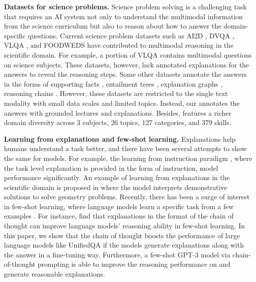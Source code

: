 \textbf{Datasets for science problems.} Science problem solving is a challenging task that requires an AI system not only to understand the multimodal information from the science curriculum but also to reason about how to answer the domain-specific questions. Current science problem datasets such as AI2D \cite{kembhavi2016diagram}, DVQA \cite{kafle2018dvqa}, VLQA \cite{sampat2020visuo}, and FOODWEDS \cite{krishnamurthy2016semantic} have contributed to multimodal reasoning in the scientific domain. For example, a portion of VLQA contains multimodal questions on science subjects.  These datasets, however, lack annotated explanations for the answers to reveal the reasoning steps. Some other datasets annotate the answers in the forms of supporting facts \cite{mihaylov2018can,Khot2020QASCAD}, entailment trees \cite{dalvi2021explaining}, explanation graphs \cite{jansen2018worldtree}, reasoning chains \cite{jhamtani2020learning}. However, these datasets are restricted to the single text modality with small data scales and limited topics. Instead, our \name{} annotates the answers with grounded lectures and explanations. Besides, \name{} features a richer domain diversity across 3 subjects, 26 topics, 127 categories, and 379 skills.

\textbf{Learning from explanations and few-shot learning.}
Explanations help humans understand a task better, and there have been several attempts to show the same for models. For example, the learning from instruction paradigm \cite{mishra2021cross,ouyang2022training,wei2021finetuned,mishra2021reframing,parmar-etal-2022-boxbart, lampinen2022can}, where the task level explanation is provided in the form of instruction,  model performance significantly.
An example of learning from explanations in the scientific domain is proposed in \cite{sachan2017learning} where the model interprets demonstrative solutions to solve geometry problems.
Recently, there has been a surge of interest in few-shot learning, where language models learn a specific task from a few examples \cite{perez2021true,bragg2021flex}. For instance, \cite{nye2021show,wei2022chain,lu2022dynamic} find that explanations in the format of the chain of thought can improve language models' reasoning ability in few-shot learning. In this paper, we show that the chain of thought boosts the performance of large language models like UnifiedQA \cite{khashabi2020unifiedqa} if the models generate explanations along with the answer in a fine-tuning way. Furthermore, a few-shot GPT-3 model via chain-of-thought prompting is able to improve the reasoning performance on \name{} and generate reasonable explanations.


